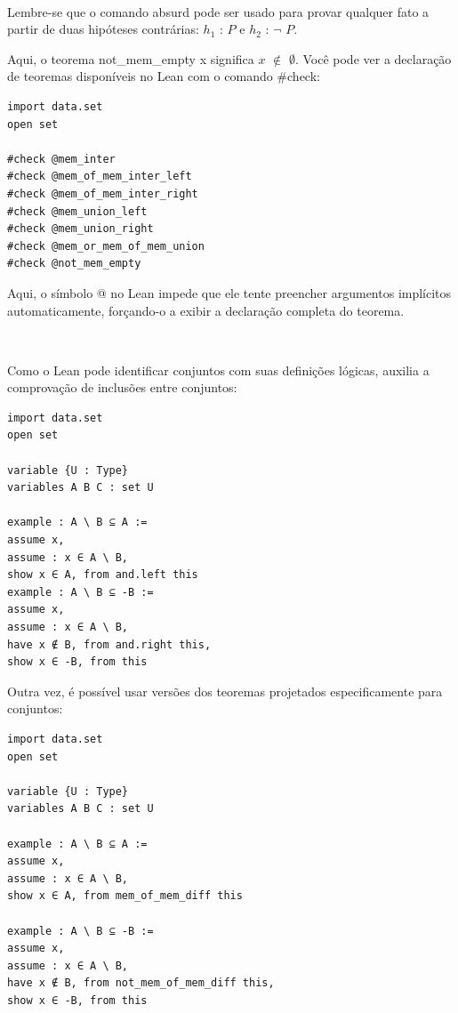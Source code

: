 $\qquad$

Lembre-se que o comando{
\selectfont absurd} pode ser usado para provar qualquer fato a partir de duas hipóteses contrárias: $h_1$ : $P$ e $h_2$ : $\neg$ $P$. 

Aqui, o teorema {
\selectfont not\_mem\_empty x} significa $x$ $\notin$ $\emptyset$. Você pode ver a declaração de teoremas disponíveis no Lean com o comando{
\selectfont \#check}:

\begin{lstlisting}
import data.set
open set

#check @mem_inter
#check @mem_of_mem_inter_left
#check @mem_of_mem_inter_right
#check @mem_union_left
#check @mem_union_right
#check @mem_or_mem_of_mem_union
#check @not_mem_empty

\end{lstlisting}

Aqui, o símbolo{
\selectfont @} no Lean impede que ele tente preencher argumentos implícitos automaticamente, forçando-o a exibir a declaração completa do teorema.

$\qquad$

Como o Lean pode identificar conjuntos com suas definições lógicas, auxilia a comprovação de inclusões entre conjuntos:

\begin{lstlisting}
import data.set
open set

variable {U : Type}
variables A B C : set U

example : A \ B ⊆ A :=
assume x,
assume : x ∈ A \ B,
show x ∈ A, from and.left this
example : A \ B ⊆ -B :=
assume x,
assume : x ∈ A \ B,
have x ∉ B, from and.right this,
show x ∈ -B, from this

\end{lstlisting}

Outra vez, é possível usar versões dos teoremas projetados especificamente para conjuntos:

\begin{lstlisting}
import data.set
open set

variable {U : Type}
variables A B C : set U

example : A \ B ⊆ A :=
assume x,
assume : x ∈ A \ B,
show x ∈ A, from mem_of_mem_diff this

example : A \ B ⊆ -B :=
assume x,
assume : x ∈ A \ B,
have x ∉ B, from not_mem_of_mem_diff this,
show x ∈ -B, from this

\end{lstlisting}

